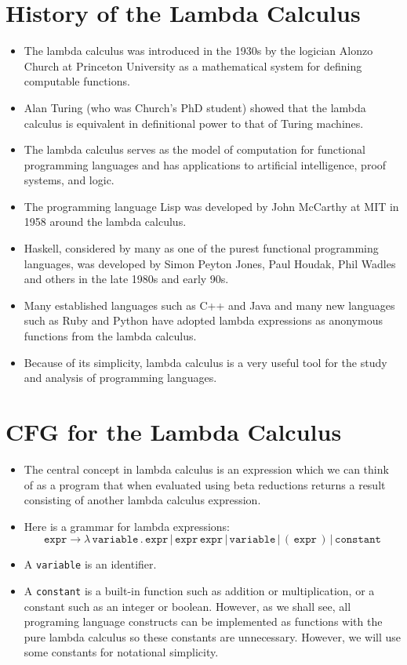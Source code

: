 \documentclass[]{article}
\begin{document}
\section{History of the Lambda Calculus}
\begin{itemize}
\item The lambda calculus was introduced in the 1930s by the logician Alonzo
Church at Princeton University as a mathematical system for defining computable
functions.
\item Alan Turing (who was Church's PhD student) showed that the lambda calculus
is equivalent in definitional power to that of Turing machines.
\item The lambda calculus serves as the model of computation for functional
programming languages and has applications to artificial intelligence, proof
systems, and logic.
\item The programming language Lisp was developed by John McCarthy at MIT in
1958 around the lambda calculus.
\item Haskell, considered by many as one of the purest functional programming
languages, was developed by Simon Peyton Jones, Paul Houdak, Phil Wadles and
others in the late 1980s and early 90s.
\item Many established languages such as C++ and Java and many new languages
such as Ruby and Python have adopted lambda expressions as anonymous functions
from the lambda calculus.
\item Because of its simplicity, lambda calculus is a very useful tool for the
study and analysis of programming languages.
\end{itemize}

\section{CFG for the Lambda Calculus}
\begin{itemize}
\item The central concept in lambda calculus is an expression which we can think
of as a program that when evaluated using beta reductions returns a result
consisting of another lambda calculus expression.
\item Here is a grammar for lambda expressions:
\[\texttt{expr}\rightarrow\lambda\,\texttt{variable}\,.\,\texttt{expr}\,|\,
\texttt{expr}\,\texttt{expr}\,|\,\texttt{variable}\,|\,(\,\texttt{expr}\,)\,|\,
\texttt{constant} \]
\item A \texttt{variable} is an identifier.
\item A \texttt{constant} is a built-in function such as addition or
multiplication, or a constant such as an integer or boolean. However, as we
shall see, all programing language constructs can be implemented as functions
with the pure lambda calculus so these constants are unnecessary. However, we
will use some constants for notational simplicity.
\end{itemize}
\end{document}
